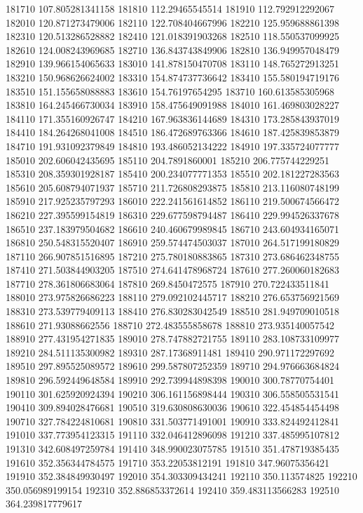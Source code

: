 {181710 107.805281341158
181810 112.29465545514
181910 112.792912292067
182010 120.871273479006
182110 122.708404667996
182210 125.959688861398
182310 120.513286528882
182410 121.018391903268
182510 118.550537099925
182610 124.008243969685
182710 136.843743849906
182810 136.949957048479
182910 139.966154065633
183010 141.878150470708
183110 148.765272913251
183210 150.968626624002
183310 154.874737736642
183410 155.580194719176
183510 151.155658088883
183610 154.76197654295
183710 160.613585305968
183810 164.245466730034
183910 158.475649091988
184010 161.469803028227
184110 171.355160926747
184210 167.963836144689
184310 173.285843937019
184410 184.264268041008
184510 186.472689763366
184610 187.425839853879
184710 191.931092379849
184810 193.486052134222
184910 197.335724077777
185010 202.606042435695
185110 204.7891860001
185210 206.775744229251
185310 208.359301928187
185410 200.234077771353
185510 202.181227283563
185610 205.608794071937
185710 211.726808293875
185810 213.116080748199
185910 217.925235797293
186010 222.241561614852
186110 219.500674566472
186210 227.395599154819
186310 229.677598794487
186410 229.994526337678
186510 237.183979504682
186610 240.460679989845
186710 243.604934165071
186810 250.548315520407
186910 259.574474503037
187010 264.517199180829
187110 266.907851516895
187210 275.780180883865
187310 273.686462348755
187410 271.503844903205
187510 274.641478968724
187610 277.260060182683
187710 278.361806683064
187810 269.8450472575
187910 270.722433511841
188010 273.975826686223
188110 279.092102445717
188210 276.653756921569
188310 273.539779409113
188410 276.830283042549
188510 281.949709010518
188610 271.93088662556
188710 272.483555858678
188810 273.935140057542
188910 277.431954271835
189010 278.747882721755
189110 283.108733109977
189210 284.511135300982
189310 287.17368911481
189410 290.971172297692
189510 297.895525089572
189610 299.587807252359
189710 294.976663684824
189810 296.592449648584
189910 292.739944898398
190010 300.78770754401
190110 301.625920924394
190210 306.161156898444
190310 306.558505531541
190410 309.894028476681
190510 319.630808630036
190610 322.454854454498
190710 327.784224810681
190810 331.503771491001
190910 333.824492412841
191010 337.773954123315
191110 332.046412896098
191210 337.485995107812
191310 342.608497259784
191410 348.990023075785
191510 351.478719385435
191610 352.356344784575
191710 353.22053812191
191810 347.96075356421
191910 352.384849930497
192010 354.303309434241
192110 350.113574825
192210 350.056989199154
192310 352.886853372614
192410 359.483113566283
192510 364.239817779617
}
